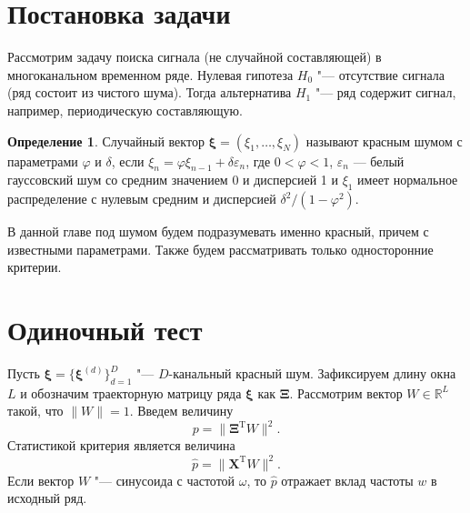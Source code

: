 \documentclass[specialist,
substylefile = spbu_report.rtx,
subf,href,colorlinks=true, 12pt]{disser}
\newcommand{\traj}{\mathbf{X}}
\newcommand{\transponse}{^\mathrm{T}}
\theoremstyle{definition}
\newtheorem{definition}{Определение}
\newcommand{\R}{\mathbb{R}}
\newcommand{\bfxi}{\boldsymbol{\xi}}
\begin{document}
\section{Постановка задачи}
Рассмотрим задачу поиска сигнала (не случайной составляющей) в многоканальном временном ряде. Нулевая гипотеза $H_0$ "--- отсутствие сигнала (ряд состоит из чистого шума). Тогда альтернатива $H_1$ "--- ряд содержит сигнал, например, периодическую составляющую. 
\begin{definition}
	Случайный вектор $\boldsymbol{\xi}=(\xi_1,\dots,\xi_N)$ называют красным шумом с параметрами $\varphi$ и $\delta$, если $\xi_n = \varphi\xi_{n-1} + \delta\varepsilon_n$, где $0<\varphi<1$, $\varepsilon_n$ — белый гауссовский шум со средним значением 0 и дисперсией 1 и $\xi_1$ имеет нормальное распределение с нулевым средним и дисперсией $\delta^2/(1-\varphi^2)$.
\end{definition}
В данной главе под шумом будем подразумевать именно красный, причем с известными параметрами.  Также будем рассматривать только односторонние критерии.

\section{Одиночный тест}
Пусть $\bfxi=\{\bfxi^{(d)}\}_{d=1}^D$ "--- $D$-канальный красный шум. Зафиксируем длину окна $L$ и обозначим траекторную матрицу ряда $\boldsymbol{\xi}$ как $\mathbf\Xi$. Рассмотрим вектор $W\in \R^{L}$ такой, что $\|W\|=1$. Введем величину
\[
	p=\|\mathbf{\Xi}\transponse W\|^2.
\]
Статистикой критерия является величина
\[
	\widehat{p}=\|\traj\transponse W\|^2.
\]
Если вектор $W$ "--- синусоида с частотой $\omega$, то $\widehat{p}$ отражает вклад частоты $w$ в исходный ряд.
\end{document}
